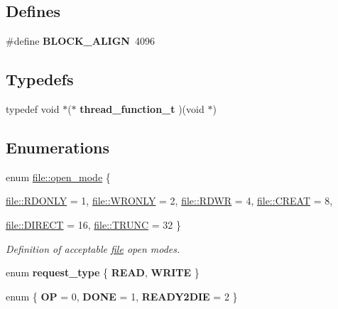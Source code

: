 \subsection*{Defines}
\begin{CompactItemize}
\item 
\hypertarget{group__iolayer_g7b2ccd4066e12ad8fe334a6bb2672439}{
\#define \textbf{BLOCK\_\-ALIGN}~4096}
\label{group__iolayer_g7b2ccd4066e12ad8fe334a6bb2672439}

\end{CompactItemize}
\subsection*{Typedefs}
\begin{CompactItemize}
\item 
\hypertarget{group__iolayer_g58898dd8329c13c5698222ab6c8dfa7b}{
typedef void $\ast$($\ast$ \textbf{thread\_\-function\_\-t} )(void $\ast$)}
\label{group__iolayer_g58898dd8329c13c5698222ab6c8dfa7b}

\end{CompactItemize}
\subsection*{Enumerations}
\begin{CompactItemize}
\item 
enum \hyperlink{group__iolayer_ge71b15e0014e7ce4dc13c8f83aa97582}{file::open\_\-mode} \{ \par
\hyperlink{group__iolayer_gge71b15e0014e7ce4dc13c8f83aa97582ac58f1566e053cf5f8ee9dcb5f97b82b}{file::RDONLY} =  1, 
\hyperlink{group__iolayer_gge71b15e0014e7ce4dc13c8f83aa97582de40e8cbe66eb259ed5378c7d13b4f69}{file::WRONLY} =  2, 
\hyperlink{group__iolayer_gge71b15e0014e7ce4dc13c8f83aa97582afcab766b3f436a66049b850ef7efb5c}{file::RDWR} =  4, 
\hyperlink{group__iolayer_gge71b15e0014e7ce4dc13c8f83aa97582971314bb8ab4fa48a078a4164c704edd}{file::CREAT} =  8, 
\par
\hyperlink{group__iolayer_gge71b15e0014e7ce4dc13c8f83aa97582e1e222042131ddbb85b2bd3fc0f80653}{file::DIRECT} =  16, 
\hyperlink{group__iolayer_gge71b15e0014e7ce4dc13c8f83aa975828842a94419a50b809fdead40a130785d}{file::TRUNC} =  32
 \}
\begin{CompactList}\small\item\em Definition of acceptable \hyperlink{classfile}{file} open modes. \item\end{CompactList}\item 
enum \textbf{request\_\-type} \{ \textbf{READ}, 
\textbf{WRITE}
 \}
\item 
enum \{ \textbf{OP} =  0, 
\textbf{DONE} =  1, 
\textbf{READY2DIE} =  2
 \}
\end{CompactItemize}
